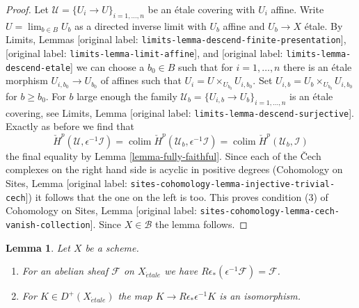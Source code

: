 \documentclass[10pt,a4paper]{article}
\theoremstyle{plain}
\newtheorem{lemma}[subsection]{Lemma}
\theoremstyle{definition}
\theoremstyle{remark}
\numberwithin{equation}{subsection}
\def\lim{\mathop{\mathrm{lim}}\nolimits}
\def\colim{\mathop{\mathrm{colim}}\nolimits}
\def\etale{{\acute{e}tale}}
\begin{document}
\begin{proof}
\medskip\noindent
Let $\mathcal{U} = \{U_i \to U\}_{i = 1, \ldots, n}$ be an \'etale covering
with $U_i$ affine. Write $U = \lim_{b \in B} U_b$ as a directed inverse limit
with $U_b$ affine and $U_b \to X$ \'etale.
By Limits, Lemmas \textnormal{[original label: \nolinkurl{limits-lemma-descend-finite-presentation}]},
\textnormal{[original label: \nolinkurl{limits-lemma-limit-affine}]}, and
\textnormal{[original label: \nolinkurl{limits-lemma-descend-etale}]}
we can choose a $b_0 \in B$ such that for $i = 1, \ldots, n$ there is an
\'etale morphism $U_{i, b_0} \to U_{b_0}$ of affines
such that $U_i = U \times_{U_{b_0}} U_{i, b_0}$.
Set $U_{i, b} = U_b \times_{U_{b_0}} U_{i, b_0}$ for $b \geq b_0$.
For $b$ large enough the family
$\mathcal{U}_b = \{U_{i, b} \to U_b\}_{i = 1, \ldots, n}$
is an \'etale covering, see
Limits, Lemma \textnormal{[original label: \nolinkurl{limits-lemma-descend-surjective}]}.
Exactly as before we find that
$$
\check{H}^p(\mathcal{U}, \epsilon^{-1}\mathcal{I}) =
\colim \check{H}^p(\mathcal{U}_b, \epsilon^{-1}\mathcal{I}) =
\colim \check{H}^p(\mathcal{U}_b, \mathcal{I})
$$
the final equality by Lemma \ref{lemma-fully-faithful}.
Since each of the {\v C}ech complexes on the right hand side is
acyclic in positive degrees
(Cohomology on Sites, Lemma
\textnormal{[original label: \nolinkurl{sites-cohomology-lemma-injective-trivial-cech}]})
it follows that the one on the left is too. This proves condition (3) of
Cohomology on Sites, Lemma \textnormal{[original label: \nolinkurl{sites-cohomology-lemma-cech-vanish-collection}]}.
Since $X \in \mathcal{B}$ the lemma follows.
\end{proof}

\begin{lemma}
\label{lemma-relative-comparison}
Let $X$ be a scheme.
\begin{enumerate}
\item For an abelian sheaf $\mathcal{F}$ on $X_\etale$
we have $R\epsilon_*(\epsilon^{-1}\mathcal{F}) = \mathcal{F}$.
\item For $K \in D^+(X_\etale)$ the map $K \to R\epsilon_*\epsilon^{-1}K$
is an isomorphism.
\end{enumerate}
\end{lemma}
\end{document}
